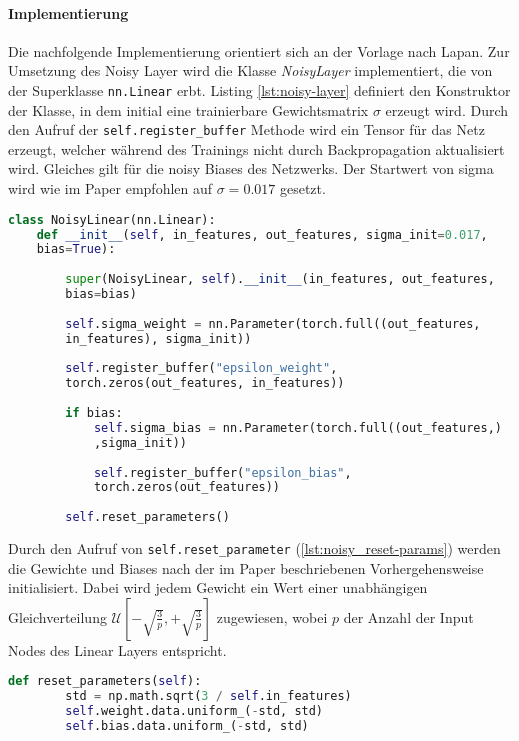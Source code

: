 \documentclass[11pt]{scrartcl}
\begin{document}
\paragraph*{Implementierung}
\noindent
\newline
Die nachfolgende Implementierung orientiert sich an der Vorlage nach Lapan\cite[~S.179]{L2018}.
Zur Umsetzung des Noisy Layer wird die Klasse \textit{NoisyLayer} implementiert, die von der
Superklasse \lstinline!nn.Linear! erbt. Listing \ref{lst:noisy-layer} definiert den Konstruktor
der Klasse, in dem initial eine trainierbare Gewichtsmatrix $\sigma$ erzeugt wird. Durch den
Aufruf der \lstinline!self.register_buffer! Methode wird ein Tensor für das Netz erzeugt, welcher
während des Trainings nicht durch Backpropagation aktualisiert wird. Gleiches gilt für die noisy
Biases des Netzwerks. Der Startwert von sigma wird wie im Paper empfohlen \cite[~S.6]{FAPMOGM2017}
auf $\sigma=0.017$ gesetzt.

\begin{lstlisting}[language=Python, caption=Konstruktor Noisy Layer, label=lst:noisy-layer]
class NoisyLinear(nn.Linear):
	def __init__(self, in_features, out_features, sigma_init=0.017, 
	bias=True):
		
		super(NoisyLinear, self).__init__(in_features, out_features,
		bias=bias)
		
		self.sigma_weight = nn.Parameter(torch.full((out_features,
		in_features), sigma_init))
		
		self.register_buffer("epsilon_weight", 
		torch.zeros(out_features, in_features))
		
		if bias:
    		self.sigma_bias = nn.Parameter(torch.full((out_features,)
    		,sigma_init))
    		
    		self.register_buffer("epsilon_bias", 
    		torch.zeros(out_features))
    		
		self.reset_parameters()
\end{lstlisting}

Durch den Aufruf von \lstinline!self.reset_parameter! (\ref{lst:noisy_reset-params}) werden die
Gewichte und Biases nach der im Paper beschriebenen Vorhergehensweise initialisiert. Dabei wird
jedem Gewicht ein Wert einer unabhängigen Gleichverteilung
$\mathcal{U}[-\sqrt{\frac{3}{p}},+\sqrt{\frac{3}{p}}]$ zugewiesen, wobei $p$ der Anzahl der
Input Nodes des Linear Layers entspricht.
 
\begin{lstlisting}[language=Python, caption=Reinitialisierung der Gewichte und Biases, 
label=lst:noisy_reset-params]
	def reset_parameters(self):
		std = np.math.sqrt(3 / self.in_features)
		self.weight.data.uniform_(-std, std)
		self.bias.data.uniform_(-std, std)
\end{lstlisting}
\end{document}
